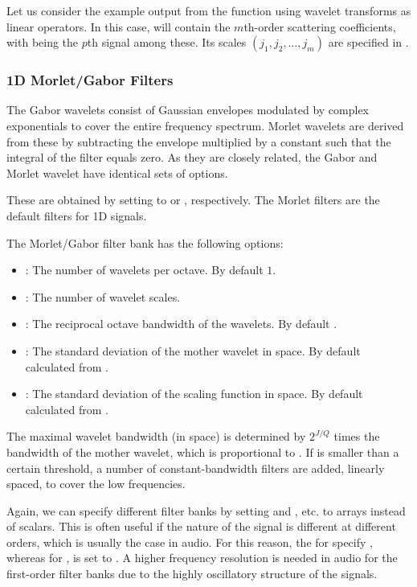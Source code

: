 \documentclass{article}
\begin{document}
Let us consider the example output  from the  function using wavelet transforms as linear operators. In this case,  will contain the $m$th-order scattering coefficients, with  being the $p$th signal among these. Its scales $(j_1,j_2,\ldots,j_m)$ are specified in .

\subsubsection{1D Morlet/Gabor Filters}
The Gabor wavelets consist of Gaussian envelopes modulated by complex exponentials to cover the entire frequency spectrum. Morlet wavelets are derived from these by subtracting the envelope multiplied by a constant such that the integral of the filter equals zero. As they are closely related, the Gabor and Morlet wavelet have identical sets of options.

These are obtained by setting  to  or , respectively. The Morlet filters are the default filters for 1D signals. 

The Morlet/Gabor filter bank has the following options:
\begin{itemize}
	\item {}: The number of wavelets per octave. By default $1$.
	\item {}: The number of wavelet scales.
	\item {}: The reciprocal octave bandwidth of the wavelets. By default .
	\item {}: The standard deviation of the mother wavelet in space. By default calculated from .
	\item {}: The standard deviation of the scaling function in space. By default calculated from .
\end{itemize}
The maximal wavelet bandwidth (in space) is determined by $2^{J/Q}$ times the bandwidth of the mother wavelet, which is proportional to . If  is smaller than a certain threshold, a number of constant-bandwidth filters are added, linearly spaced, to cover the low frequencies.

Again, we can specify different filter banks by setting  and , etc. to arrays instead of scalars. This is often useful if the nature of the signal is different at different orders, which is usually the case in audio. For this reason, the  for  specify , whereas for ,  is set to . A higher frequency resolution is needed in audio for the first-order filter banks due to the highly oscillatory structure of the signals.
\end{document}
